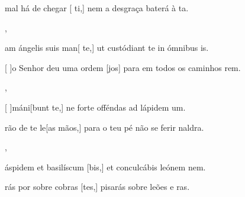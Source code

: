 {    {\item {} mal há de chegar [ ti,] nem a desgraça baterá à ta.~\Antiphona},
  {\item {}am ángelis suis man[ te,] ut custódiant te in ómnibus is.~\Antiphona}%
    {\item {}[ ]{o} Senhor deu uma ordem [jos] para em todos os caminhos rem.~\Antiphona},
  {\item {}[ ]{má}ni[bunt te,] ne forte offéndas ad lápidem um.~\Antiphona}%
    {\item {}rão de te le[as mãos,] para o teu pé não se ferir naldra.~\Antiphona},
  {\item {} áspidem et basilíscum [bis,] et conculcábis leónem nem.~\Antiphona}%
    {\item {}rás por sobre cobras [tes,] pisarás sobre leões e ras.~\Antiphona}
}